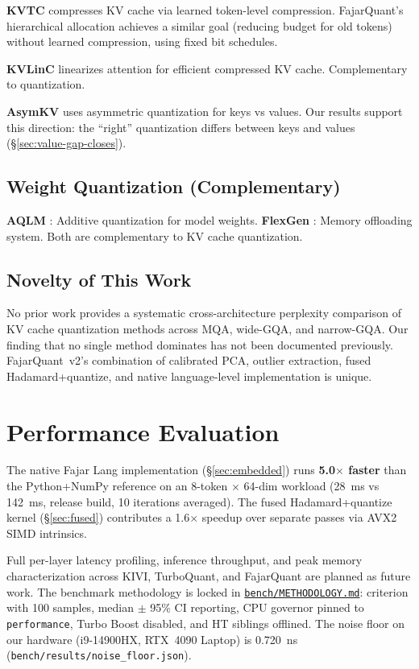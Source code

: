 \documentclass{article}
\begin{document}
\textbf{KVTC} \citep{zhang2024kvtc} compresses KV cache via
learned token-level compression. FajarQuant's hierarchical allocation
achieves a similar goal (reducing budget for old tokens) without learned
compression, using fixed bit schedules.

\textbf{KVLinC} \citep{wang2025kvlinc} linearizes attention for
efficient compressed KV cache. Complementary to quantization.

\textbf{AsymKV} \citep{he2024asymkv} uses asymmetric quantization
for keys vs values. Our results support this direction: the
``right'' quantization differs between keys and values
(\S\ref{sec:value-gap-closes}).

\subsection{Weight Quantization (Complementary)}

\textbf{AQLM} \citep{egiazarian2024aqlm}: Additive quantization for
model weights. \textbf{FlexGen} \citep{sheng2023flexgen}: Memory
offloading system. Both are complementary to KV cache quantization.

\subsection{Novelty of This Work}

No prior work provides a systematic cross-architecture perplexity
comparison of KV cache quantization methods across MQA, wide-GQA, and
narrow-GQA. Our finding that no single method dominates has not been
documented previously. FajarQuant~v2's combination of calibrated PCA,
outlier extraction, fused Hadamard+quantize, and native language-level
implementation is unique.

\section{Performance Evaluation}
\label{sec:perf}

The native Fajar Lang implementation (\S\ref{sec:embedded}) runs
\textbf{5.0$\times$ faster} than the Python+NumPy reference on an
8-token $\times$ 64-dim workload (28~ms vs 142~ms, release build,
10 iterations averaged). The fused Hadamard+quantize kernel
(\S\ref{sec:fused}) contributes a 1.6$\times$ speedup over separate
passes via AVX2 SIMD intrinsics.

Full per-layer latency profiling, inference throughput, and peak memory
characterization across KIVI, TurboQuant, and FajarQuant are planned
as future work. The benchmark methodology is locked in
\href{https://github.com/fajarkraton/fajarquant/blob/main/bench/METHODOLOGY.md}{\texttt{bench/METHODOLOGY.md}}:
criterion with 100 samples, median $\pm$ 95\% CI reporting, CPU
governor pinned to \texttt{performance}, Turbo Boost disabled, and
HT siblings offlined. The noise floor on our hardware (i9-14900HX,
RTX~4090 Laptop) is 0.720~ns
(\texttt{bench/results/noise\_floor.json}).
\end{document}
